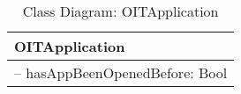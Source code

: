 \begin{table}[ht]
\centering
\caption{Class Diagram: OITApplication}

\hspace{1em}
\renewcommand{\arraystretch}{1.7}

\begin{tabular}{|l|}
\hline
\textbf{OITApplication} \\
\hline
– hasAppBeenOpenedBefore: Bool \\
\hline
\end{tabular}
\end{table}
